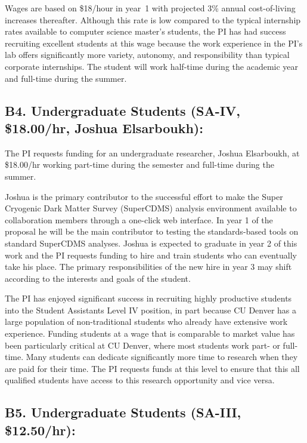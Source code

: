 \documentclass[11pt,oneside]{memoir}
\begin{document}
Wages are based on \$18/hour in year~1 with projected 3\% annual cost-of-living increases thereafter. Although this rate is low compared to the typical internship rates available to computer science master's students, the PI has had success recruiting excellent students at this wage because the work experience in the PI's lab offers significantly more variety, autonomy, and responsibility than typical corporate internships.  The student will work half-time during the academic year and full-time during the summer. 

\subsection{B4. Undergraduate Students (SA-IV, \$18.00/hr, Joshua Elsarboukh):}

The PI requests funding for an undergraduate researcher, Joshua Elsarboukh, at \$18.00/hr working part-time during the semester and full-time during the summer.  

Joshua is the primary contributor to the successful effort to make the Super Cryogenic Dark Matter Survey (SuperCDMS) analysis environment available to collaboration members through a one-click web interface.  In year 1 of the proposal he will be the main contributor to testing the standards-based tools on standard SuperCDMS analyses.  Joshua is expected to graduate in year 2 of this work and the PI requests funding to hire and train students who can eventually take his place.  The primary responsibilities of the new hire in year 3 may shift according to the interests and goals of the student.

The PI has enjoyed significant success in recruiting highly productive students into the Student Assistants Level IV position, in part because CU Denver has a large population of non-traditional students who already have extensive work experience.
Funding students at a wage that is comparable to market value has been particularly critical at CU Denver, where most students work part- or full-time.  Many students can dedicate significantly more time to research when they are paid for their time.  The PI requests funds at this level to ensure that this all qualified students have access to this research opportunity and vice versa. 

\subsection{B5. Undergraduate Students (SA-III, \$12.50/hr):}
\end{document}
